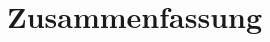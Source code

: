 \documentclass[12pt]{article} %
\begin{document}
\section{Zusammenfassung}



\begin{thebibliography}{99} %


\end{thebibliography}

\end{document}
